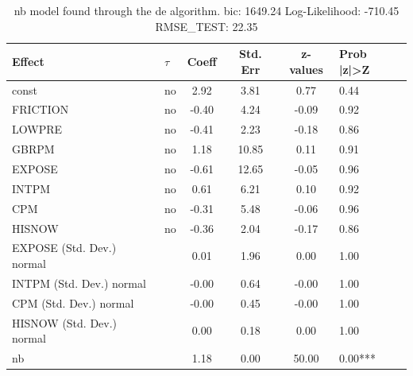 \begin{table}
	\caption{nb model found through the de algorithm. bic: 1649.24 Log-Likelihood: -710.45 RMSE_TEST: 22.35}
	\begin{center}
		\begin{tabular}{|l|l|c|c|c|l|}
			\hline
			Effect & $\tau$ & Coeff & Std. Err & z-values & Prob |z|>Z \\
			\hline
			const & no & 2.92 & 3.81 & 0.77 & 0.44 \\
			\hline
			FRICTION & no & -0.40 & 4.24 & -0.09 & 0.92 \\
			\hline
			LOWPRE & no & -0.41 & 2.23 & -0.18 & 0.86 \\
			\hline
			GBRPM & no & 1.18 & 10.85 & 0.11 & 0.91 \\
			\hline
			EXPOSE & no & -0.61 & 12.65 & -0.05 & 0.96 \\
			\hline
			INTPM & no & 0.61 & 6.21 & 0.10 & 0.92 \\
			\hline
			CPM & no & -0.31 & 5.48 & -0.06 & 0.96 \\
			\hline
			HISNOW & no & -0.36 & 2.04 & -0.17 & 0.86 \\
			\hline
			EXPOSE (Std. Dev.) normal &  & 0.01 & 1.96 & 0.00 & 1.00 \\
			\hline
			INTPM (Std. Dev.) normal &  & -0.00 & 0.64 & -0.00 & 1.00 \\
			\hline
			CPM (Std. Dev.) normal &  & -0.00 & 0.45 & -0.00 & 1.00 \\
			\hline
			HISNOW (Std. Dev.) normal &  & 0.00 & 0.18 & 0.00 & 1.00 \\
			\hline
			nb &  & 1.18 & 0.00 & 50.00 & 0.00*** \\
			\hline
		\end{tabular}
	\end{center}
\end{table}
